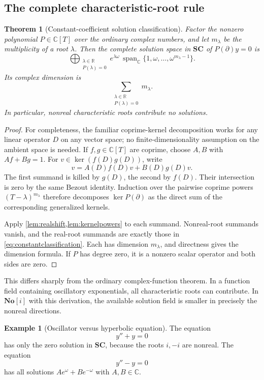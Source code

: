 \documentclass[11pt,letterpaper]{article}
\numberwithin{equation}{section}
\newtheorem{theorem}{Theorem}[section]
\theoremstyle{definition}
\newtheorem{example}[example]{Example}
\theoremstyle{remark}
\newcommand{\No}{\mathbf{No}}
\newcommand{\SC}{\mathbf{SC}}
\newcommand{\R}{\mathbb R}
\newcommand{\C}{\mathbb C}
\newcommand{\der}{\partial}
\begin{document}
\subsection{The complete characteristic-root rule}
\begin{theorem}[Constant-coefficient solution classification]\label{thm:constant}
Factor the nonzero polynomial $P\in\C[T]$ over the ordinary complex numbers, and let $m_\lambda$ be the multiplicity of a root $\lambda$. Then the complete solution space in $\SC$ of $P(\der)y=0$ is
\begin{equation}\label{eq:constantclassification}
 \bigoplus_{\substack{\lambda\in\R\\P(\lambda)=0}}
 e^{\lambda\omega}\,
 \operatorname{span}_{\C}\{1,\omega,\ldots,\omega^{m_\lambda-1}\}.
\end{equation}
Its complex dimension is
\[
 \sum_{\substack{\lambda\in\R\\P(\lambda)=0}}m_\lambda.
\]
In particular, nonreal characteristic roots contribute no solutions.
\end{theorem}
\begin{proof}
For completeness, the familiar coprime-kernel decomposition works for any linear operator $D$ on any vector space; no finite-dimensionality assumption on the ambient space is needed. If $f,g\in\C[T]$ are coprime, choose $A,B$ with $Af+Bg=1$. For $v\in\ker(f(D)g(D))$, write
\[
 v=A(D)f(D)v+B(D)g(D)v.
\]
The first summand is killed by $g(D)$, the second by $f(D)$. Their intersection is zero by the same Bezout identity. Induction over the pairwise coprime powers $(T-\lambda)^{m_\lambda}$ therefore decomposes $\ker P(\der)$ as the direct sum of the corresponding generalized kernels.

Apply \cref{lem:realshift,lem:kernelpowers} to each summand. Nonreal-root summands vanish, and the real-root summands are exactly those in \eqref{eq:constantclassification}. Each has dimension $m_\lambda$, and directness gives the dimension formula. If $P$ has degree zero, it is a nonzero scalar operator and both sides are zero.
\end{proof}

This differs sharply from the ordinary complex-function theorem. In a function field containing oscillatory exponentials, all characteristic roots can contribute. In $\No[i]$ with this derivation, the available solution field is smaller in precisely the nonreal directions.

\begin{example}[Oscillator versus hyperbolic equation]\label{ex:osc}
The equation
\[
 y''+y=0
\]
has only the zero solution in $\SC$, because the roots $i,-i$ are nonreal. The equation
\[
 y''-y=0
\]
has all solutions $Ae^\omega+Be^{-\omega}$ with $A,B\in\C$.
\end{example}
\end{document}
